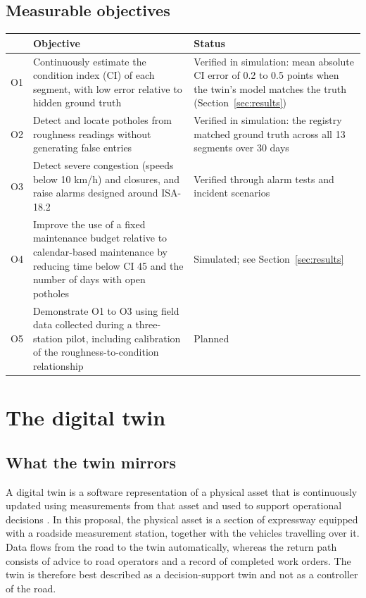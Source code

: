 \documentclass[11pt,a4paper]{article}
\begin{document}
\subsection{Measurable objectives}
\begin{center}
\small
\begin{tabularx}{\textwidth}{@{}L{1.0cm} X L{5.2cm}@{}}
\toprule
 & Objective & Status\\
\midrule
O1 & Continuously estimate the condition index (CI) of each segment, with low error relative to hidden ground truth & Verified in simulation: mean absolute CI error of 0.2 to 0.5 points when the twin's model matches the truth (Section~\ref{sec:results})\\[4pt]
O2 & Detect and locate potholes from roughness readings without generating false entries & Verified in simulation: the registry matched ground truth across all 13 segments over 30 days\\[4pt]
O3 & Detect severe congestion (speeds below 10 km/h) and closures, and raise alarms designed around ISA-18.2 \cite{isa182} & Verified through alarm tests and incident scenarios\\[4pt]
O4 & Improve the use of a fixed maintenance budget relative to calendar-based maintenance by reducing time below CI 45 and the number of days with open potholes & Simulated; see Section~\ref{sec:results}\\[4pt]
O5 & Demonstrate O1 to O3 using field data collected during a three-station pilot, including calibration of the roughness-to-condition relationship & Planned\\
\bottomrule
\end{tabularx}
\end{center}

\section{The digital twin}
\subsection{What the twin mirrors}
A digital twin is a software representation of a physical asset that is continuously updated using measurements from that asset and used to support operational decisions \cite{grieves}. In this proposal, the physical asset is a section of expressway equipped with a roadside measurement station, together with the vehicles travelling over it. Data flows from the road to the twin automatically, whereas the return path consists of advice to road operators and a record of completed work orders. The twin is therefore best described as a decision-support twin and not as a controller of the road.
\end{document}

